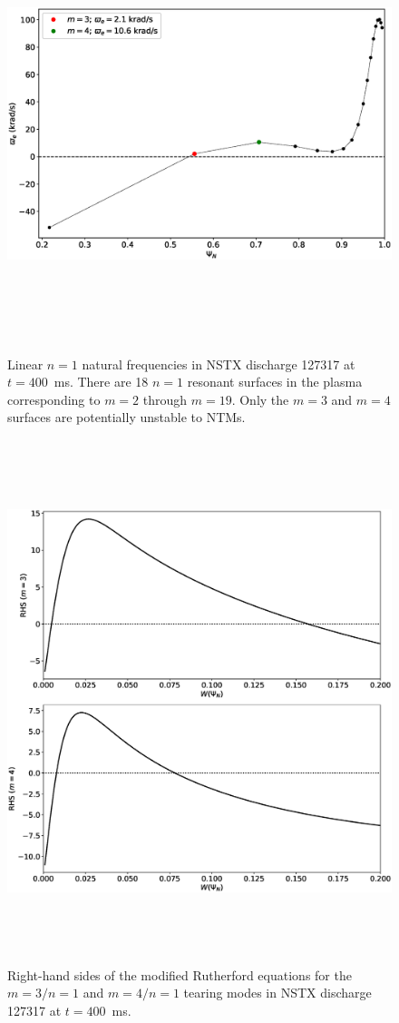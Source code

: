 \documentclass[12pt,prb,aps]{revtex4-1}
\begin{document}
\begin{figure}
\centerline{\includegraphics[height=5in]{Fig3.eps}}
\caption{Linear $n=1$ natural frequencies in NSTX discharge 127317 at $t=400$\, ms. There are 18 $n=1$ resonant surfaces in the plasma corresponding to $m=2$ through $m=19$. Only the $m=3$ and $m=4$ surfaces are potentially
unstable to NTMs.}\label{fig3}
\end{figure}

\begin{figure}
\centerline{\includegraphics[height=6in]{Fig4.eps}}
\caption{Right-hand sides of the modified Rutherford equations for the $m=3/n=1$ and $m=4/n=1$ tearing modes in NSTX discharge 127317 at $t=400$\, ms.}\label{fig4}
\end{figure}
\end{document}
